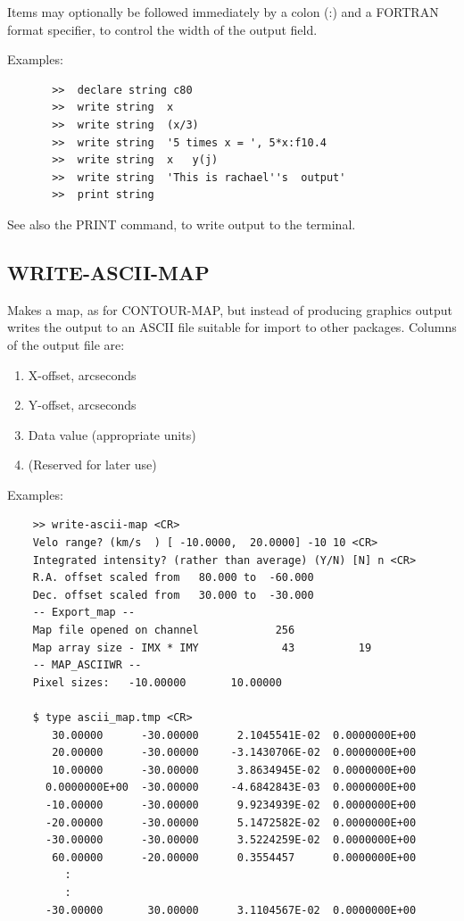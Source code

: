 \documentclass[11pt,twoside]{report}
\begin{document}
Items may optionally be followed immediately by a colon (:\index{:}) and a
FORTRAN format specifier, to control the width of the
output field.

Examples:
\begin{verbatim}
       >>  declare string c80
       >>  write string  x
       >>  write string  (x/3)
       >>  write string  '5 times x = ', 5*x:f10.4
       >>  write string  x   y(j)
       >>  write string  'This is rachael''s  output'
       >>  print string
\end{verbatim}

See also the PRINT command, to write output to the terminal.

\subsection{WRITE-ASCII-MAP} 

Makes a map, as for CONTOUR-MAP, but instead of producing graphics
output writes the output to an ASCII file suitable for import to other
packages. Columns of the output file are:
\begin{enumerate}
\item X-offset, arcseconds
\item Y-offset, arcseconds
\item Data value (appropriate units)
\item (Reserved for later use)
\end{enumerate}

Examples:
\begin{verbatim}
    >> write-ascii-map <CR>
    Velo range? (km/s  ) [ -10.0000,  20.0000] -10 10 <CR>
    Integrated intensity? (rather than average) (Y/N) [N] n <CR>
    R.A. offset scaled from   80.000 to  -60.000
    Dec. offset scaled from   30.000 to  -30.000
    -- Export_map --
    Map file opened on channel            256
    Map array size - IMX * IMY             43          19
    -- MAP_ASCIIWR --
    Pixel sizes:   -10.00000       10.00000

    $ type ascii_map.tmp <CR>
       30.00000      -30.00000      2.1045541E-02  0.0000000E+00
       20.00000      -30.00000     -3.1430706E-02  0.0000000E+00
       10.00000      -30.00000      3.8634945E-02  0.0000000E+00
      0.0000000E+00  -30.00000     -4.6842843E-03  0.0000000E+00
      -10.00000      -30.00000      9.9234939E-02  0.0000000E+00
      -20.00000      -30.00000      5.1472582E-02  0.0000000E+00
      -30.00000      -30.00000      3.5224259E-02  0.0000000E+00
       60.00000      -20.00000      0.3554457      0.0000000E+00
         :
         :
      -30.00000       30.00000      3.1104567E-02  0.0000000E+00

\end{verbatim}
\end{document}
